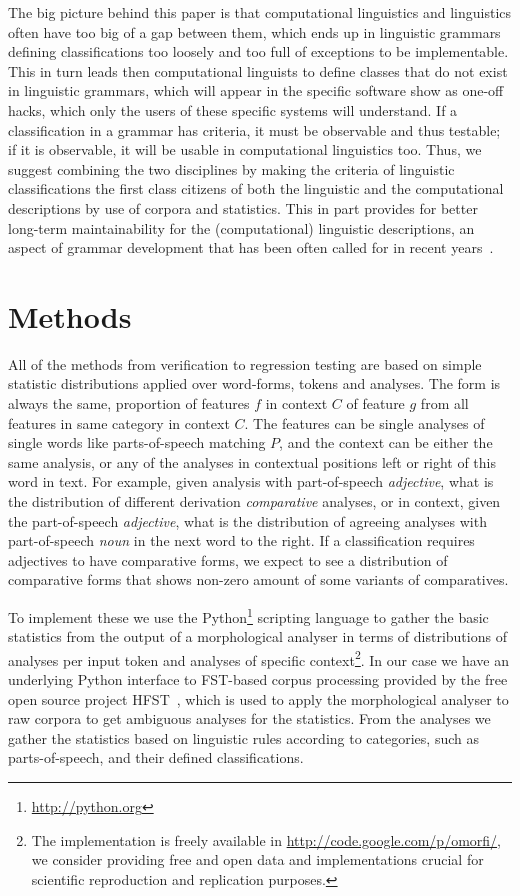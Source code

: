 \documentclass[a5paper]{article}
\begin{document}
The big picture behind this paper is that computational linguistics and
linguistics often have too big of a gap between them, which ends up in
linguistic grammars defining classifications too loosely and too full of
exceptions to be implementable. This in turn leads then computational linguists
to define classes that do not exist in linguistic grammars, which will appear
in the specific software show as one-off hacks, which only the users of these
specific systems will understand. If a classification in a grammar has 
criteria, it must be observable and thus testable; if it is observable, it will
be usable in computational linguistics too. Thus, we suggest combining the two
disciplines by making the criteria of linguistic classifications the first
class citizens of both the linguistic and the computational descriptions by use
of corpora and statistics.  This in part provides for better long-term
maintainability for the (computational) linguistic descriptions, an aspect of
grammar development that has been often called for in recent years~\cite{maxwell2013system,maxwell2008joint,moshagen2013building,pirinen2011modularisation}.

\section{Methods}

All of the methods from verification to regression testing are based on simple
statistic distributions applied over word-forms, tokens and analyses. The form
is always the same, proportion of features $f$ in context $C$ of feature $g$ 
from all features in same category in context $C$. The features can be 
single analyses of single words like parts-of-speech matching $P$, and the context can
be either the same analysis, or any of the analyses in contextual positions
left or right of this word in text. For example, given analysis with part-of-speech
\emph{adjective}, what is the distribution of different derivation
\emph{comparative} analyses, or in context, given the part-of-speech
\emph{adjective}, what is the distribution of agreeing analyses with
part-of-speech \emph{noun} in the next word to the right. If a classification
requires adjectives to have comparative forms, we expect to see a distribution of
comparative forms that shows non-zero amount of some variants of comparatives.

To implement these we use the Python\footnote{\url{http://python.org}}
scripting language to gather the basic statistics from the output of a
morphological analyser in terms of distributions of analyses per input token
and analyses of specific context\footnote{The implementation is freely
available in \url{http://code.google.com/p/omorfi/}, we consider providing free and open data and
implementations crucial for scientific reproduction and replication purposes.}.
In our case we have an underlying Python interface to FST-based corpus
processing provided by the free open source project HFST~\cite{linden2013hfst},
which is used to apply the morphological analyser to raw corpora to get
ambiguous analyses for the statistics. From the analyses we gather the
statistics based on linguistic rules according to categories, such as
parts-of-speech, and their defined classifications.
\end{document}
